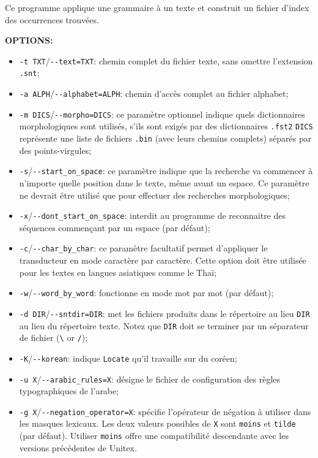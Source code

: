\bigskip
\noindent {}
Ce programme applique une grammaire à un texte et construit un fichier d’index des
occurrences trouvées.


\bigskip
\noindent \textbf{OPTIONS:}
\begin{itemize}
\item \verb+-t TXT+/\verb+--text=TXT+: chemin complet du fichier texte, 
  sans omettre l’extension \verb+.snt+;

  \item \verb+-a ALPH+/\verb+--alphabet=ALPH+: chemin d’accès complet au fichier
  	  alphabet;
  
  \item \verb+-m DICS+/\verb+--morpho=DICS+: ce paramètre optionnel indique
  	  quels dictionnaires morphologiques sont utilisés, s'ils sont exigés par des dictionnaires
  	  \verb+.fst2+
  	  \verb+DICS+ représente une liste de fichiers \verb+.bin+  (avec leurs chemins complets)
  	  séparés par des points-virgules;
  
  \item \verb+-s+/\verb+--start_on_space+: ce paramètre indique que la recherche va commencer à
  	  n'importe quelle position dans le texte, même avant un espace. Ce paramètre ne devrait
  	  être utilisé que pour effectuer des recherches morphologiques;
  
  \item \verb+-x+/\verb+--dont_start_on_space+: interdit au programme de 
  	  reconnaitre des séquences commençant par un espace (par défaut);
	
  \item \verb+-c+/\verb+--char_by_char+: ce paramètre facultatif permet d’appliquer le transducteur
  en mode caractère par caractère. Cette option doit être utilisée pour les textes en  langues
  asiatiques comme le Thaï;
  
  \item \verb+-w+/\verb+--word_by_word+: fonctionne en mode mot par mot (par défaut);
  
\item \verb+-d DIR+/\verb+--sntdir=DIR+: met les fichiers produits dans le répertoire au lieu
	\verb+DIR+ au lieu du répertoire texte. Notez que \verb+DIR+ doit se terminer par un
	séparateur de fichier (\verb+\+ or \verb+/+);
  
  \item \verb+-K+/\verb+--korean+: indique \verb+Locate+ qu'il travaille sur du coréen;

  \item \verb+-u X+/\verb+--arabic_rules=X+: désigne le fichier de configuration des règles
  	  typographiques de l'arabe;

  \item \verb+-g X+/\verb+--negation_operator=X+: spécifie l'opérateur de négation à utiliser dans
  	  les masques lexicaux. Les deux valeurs possibles de \verb+X+ sont \verb+moins+ et
  	  \verb+tilde+ (par défaut).
 Utiliser \verb+moins+ offre une compatibilité descendante avec les versions précédentes de Unitex.
\end{itemize}

